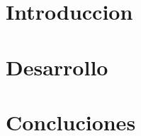 \documentclass[10pt, a4paper]{article}
\begin{document}

\tableofcontents
\pagebreak
\section{Introduccion}

\section{Desarrollo}

\section{Concluciones}

\end{document}
